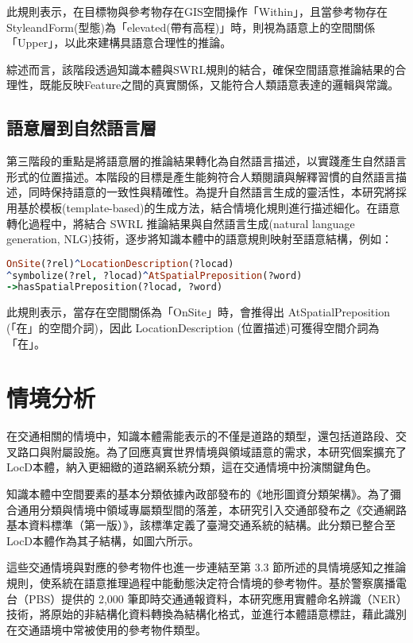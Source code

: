 此規則表示，在目標物與參考物存在GIS空間操作「Within」，且當參考物存在StyleandForm(型態)為「elevated(帶有高程)」時，則視為語意上的空間關係「Upper」，以此來建構具語意合理性的推論。

綜述而言，該階段透過知識本體與SWRL規則的結合，確保空間語意推論結果的合理性，既能反映Feature之間的真實關係，又能符合人類語意表達的邏輯與常識。

\subsection{語意層到自然語言層}

第三階段的重點是將語意層的推論結果轉化為自然語言描述，以實踐產生自然語言形式的位置描述。本階段的目標是產生能夠符合人類閱讀與解釋習慣的自然語言描述，同時保持語意的一致性與精確性。為提升自然語言生成的靈活性，本研究將採用基於模板(template-based)的生成方法，結合情境化規則進行描述細化。在語意轉化過程中，將結合 SWRL 推論結果與自然語言生成(natural language generation, NLG)技術，逐步將知識本體中的語意規則映射至語意結構，例如：

\begin{lstlisting}[language=Prolog, basicstyle=\ttfamily, xleftmargin=2em]
OnSite(?rel)^LocationDescription(?locad)
^symbolize(?rel, ?locad)^AtSpatialPreposition(?word)
->hasSpatialPreposition(?locad, ?word)
\end{lstlisting}

此規則表示，當存在空間關係為「OnSite」時，會推得出 AtSpatialPreposition (「在」的空間介詞)，因此 LocationDescription (位置描述)可獲得空間介詞為「在」。

\section{情境分析}

在交通相關的情境中，知識本體需能表示的不僅是道路的類型，還包括道路段、交叉路口與附屬設施。為了回應真實世界情境與領域語意的需求，本研究個案擴充了LocD本體，納入更細緻的道路網系統分類，這在交通情境中扮演關鍵角色。

知識本體中空間要素的基本分類依據內政部發布的《地形圖資分類架構》。為了彌合通用分類與情境中領域專屬類型間的落差，本研究引入交通部發布之《交通網路基本資料標準（第一版）》，該標準定義了臺灣交通系統的結構。此分類已整合至LocD本體作為其子結構，如圖六所示。

這些交通情境與對應的參考物件也進一步連結至第 3.3 節所述的具情境感知之推論規則，使系統在語意推理過程中能動態決定符合情境的參考物件。基於警察廣播電台（PBS）提供的 2,000 筆即時交通通報資料，本研究應用實體命名辨識（NER）技術，將原始的非結構化資料轉換為結構化格式，並進行本體語意標註，藉此識別在交通語境中常被使用的參考物件類型。

